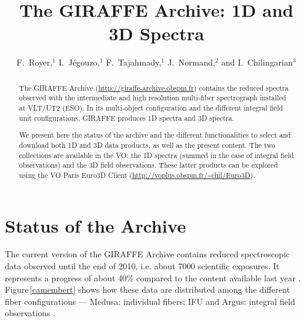 
\resetcounters



\title{The GIRAFFE Archive: 1D and 3D Spectra}
\author{F.~Royer,$^1$ I.~J\'egouzo,$^1$ F.~Tajahmady,$^1$ J.~Normand,$^2$ and I.~Chilingarian$^3$
}


\begin{abstract}
 The GIRAFFE Archive (\url{http://giraffe-archive.obspm.fr}) contains the reduced spectra observed with the intermediate and high resolution multi-fiber spectrograph installed at VLT/UT2 (ESO). In its multi-object configuration and the different integral field unit configurations, GIRAFFE produces 1D spectra and 3D spectra.

We present here the status of the archive and the different functionalities to select and download both 1D and 3D data products, as well as the present content. The two collections are available in the VO: the 1D spectra (summed in the case of integral field observations) and the 3D field observations. These latter products can be explored using the VO Paris Euro3D Client (\url{http://voplus.obspm.fr/~chil/Euro3D}). 
\end{abstract}

\section{Status of the Archive}

 The current version of the GIRAFFE Archive contains reduced spectroscopic data observed until the end of 2010, i.e. about 7000 scientific exposures. It represents a progress of about 40\% compared to the content available last year \citep{Ror_12}. Figure\,\ref{camembert} shows how these data are distributed among the different fiber configurations --- Medusa: individual fibers; IFU and Argus: integral field observations \citep[details about the instrument can be found in][]{Pai_02}. 

